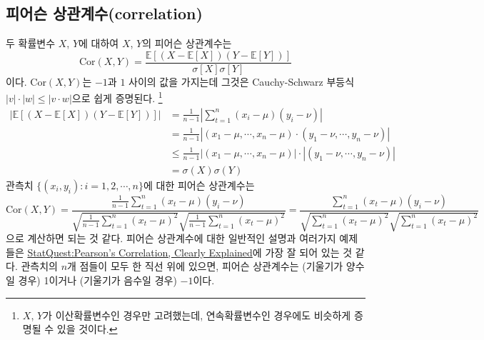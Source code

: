 \documentclass{article}
\begin{document}
\subsection{피어슨 상관계수(correlation)}
두 확률변수 \(X\), \(Y\)에 대하여 \(X\), \(Y\)의 피어슨 상관계수는 
\begin{equation}\label{pearson1}
\text{Cor}(X,Y)=\frac{\mathbb E[(X-\mathbb E[X])(Y-\mathbb E[Y])]}{\sigma[X]\sigma[Y]}
\end{equation}
이다.
\(\text{Cor}(X,Y)\)는 \(-1\)과 \(1\) 사이의 값을 가지는데 그것은 Cauchy-Schwarz 부등식 \(|v|\cdot|w|\le|v\cdot w|\)으로 쉽게 증명된다.
\footnote{\(X\), \(Y\)가 이산확률변수인 경우만 고려했는데, 연속확률변수인 경우에도 비슷하게 증명될 수 있을 것이다.}
\begin{align*}
\bigg|\mathbb E\left[\left(X-\mathbb E[X]\right)\left(Y-\mathbb E[Y]\right)\right]\bigg|
&=\frac1{n-1}\left|\sum_{t=1}^n(x_i-\mu)(y_i-\nu)\right|\\
&=\frac1{n-1}\left|(x_1-\mu,\cdots,x_n-\mu)\cdot(y_1-\nu,\cdots,y_n-\nu)\right|\\
&\le\frac1{n-1}\left|(x_1-\mu,\cdots,x_n-\mu)\right|\cdot\left|(y_1-\nu,\cdots,y_n-\nu)\right|\\
&=\sigma(X)\sigma(Y)
\end{align*}
관측치 \(\{(x_i, y_i):i=1,2,\cdots,n\}\)에 대한 피어슨 상관계수는
\begin{equation}\label{pearson2}
\text{Cor}(X,Y)
=\frac{\frac1{n-1}\sum_{t=1}^n(x_t-\mu)(y_i-\nu)}{\sqrt{\frac1{n-1}\sum_{t=1}^n(x_t-\mu)^2}\sqrt{\frac1{n-1}\sum_{t=1}^n(x_t-\mu)^2}}
=\frac{\sum_{t=1}^n(x_t-\mu)(y_i-\nu)}{\sqrt{\sum_{t=1}^n(x_t-\mu)^2}\sqrt{\sum_{t=1}^n(x_t-\mu)^2}}
\end{equation}
으로 계산하면 되는 것 같다.
피어슨 상관계수에 대한 일반적인 설명과 여러가지 예제들은 \href{https://youtu.be/xZ_z8KWkhXE}{StatQuest:Pearson's Correlation, Clearly Explained}에 가장 잘 되어 있는 것 같다.
관측치의 \(n\)개 점들이 모두 한 직선 위에 있으면, 피어슨 상관계수는 (기울기가 양수일 경우) 1이거나 (기울기가 음수일 경우) $-1$이다.

\end{document}
